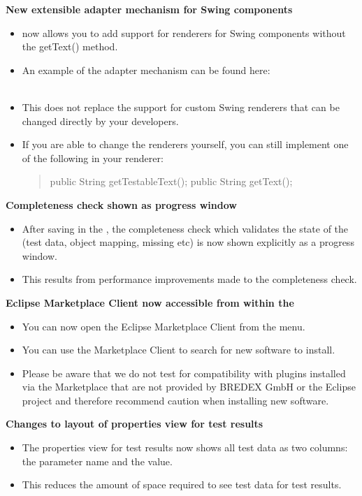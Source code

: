 \textbf{New extensible adapter mechanism for Swing components}\\
\begin{itemize}
\item \app{} now allows you to add support for renderers for Swing components without the getText() method.
\item An example of the adapter mechanism can be found here:\\
\\
\item This does not replace the support for custom Swing renderers that can be changed directly by your developers. 
\item If you are able to change the renderers yourself, you can still implement one of the following in your renderer:
\begin{quote}
public String getTestableText();
public String getText();
\end{quote}
\end{itemize}

\textbf{Completeness check shown as progress window}\\
\begin{itemize}
\item After saving in the \ite{}, the completeness check which validates the state of the \gdproject{} (test data, object mapping, missing \gdcases{} etc) is now shown explicitly as a progress window.
\item This results from performance improvements made to the completeness check.
\end{itemize} 

\textbf{Eclipse Marketplace Client now accessible from within the \ite{}}
\begin{itemize}
\item You can now open the Eclipse Marketplace Client from the  menu.
\item You can use the Marketplace Client to search for new software to install. 
\item Please be aware that we do not test \app{} for compatibility with plugins installed via the Marketplace that are not provided by BREDEX GmbH or the Eclipse \jb{} project and therefore recommend caution when installing new software. 
\end{itemize}

\textbf{Changes to layout of properties view for test results}\\
\begin{itemize}
\item The properties view for test results now shows all test data as two columns: the parameter name and the value.
\item This reduces the amount of space required to see test data for test results. 
\end{itemize} 


